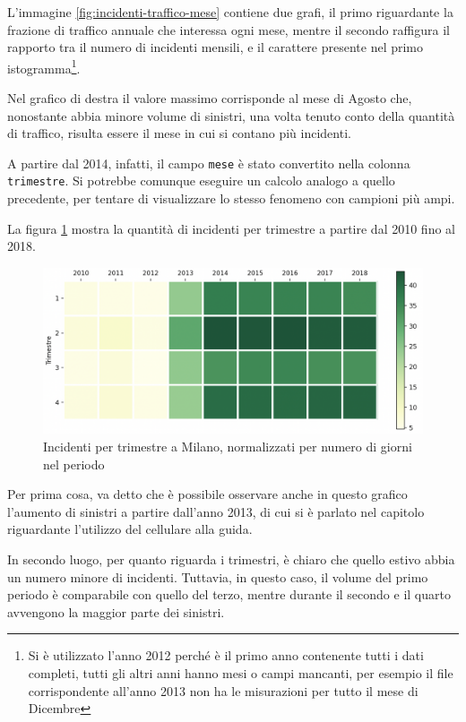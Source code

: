 \documentclass[a4paper]{report}
\newcommand{\columnstyle}[1]{\texttt{#1}}
\newcommand{\skipline}{\vspace{0.2in}}
\begin{document}
L'immagine \ref{fig:incidenti-traffico-mese} contiene due grafi, 
il primo riguardante la frazione di traffico annuale che interessa ogni mese, 
mentre il secondo raffigura il rapporto tra il numero di incidenti mensili, 
e il carattere presente nel primo
istogramma\footnote{Si è utilizzato l'anno 2012 perché è il primo anno contenente 
tutti i dati completi, tutti gli altri anni hanno mesi o campi mancanti, 
per esempio il file corrispondente all'anno 
2013 non ha le misurazioni per tutto il mese di Dicembre}. 

Nel grafico di destra il valore massimo corrisponde al mese di Agosto 
che, nonostante abbia minore volume di sinistri, 
una volta tenuto conto della quantità di traffico, risulta essere 
il mese in cui si contano più incidenti. 

\skipline
A partire dal 2014, infatti, il campo \columnstyle{mese} è stato convertito nella 
colonna \columnstyle{trimestre}. 
Si potrebbe comunque eseguire un calcolo analogo a quello precedente, 
per tentare di visualizzare lo stesso fenomeno con campioni più ampi. 

La figura \ref{fig:milano-trimestri} mostra la quantità di incidenti per 
trimestre a partire dal 2010 fino al 2018. 

\begin{figure}
    \includegraphics[width=\linewidth]{../src/incidenti/incidenti_senza_coords/mese_incidenti/trimestri.png}
    \caption{Incidenti per trimestre a Milano, normalizzati per numero di giorni nel periodo}
    \label{fig:milano-trimestri}
\end{figure}

Per prima cosa, va detto che è possibile osservare anche in questo grafico 
l'aumento di sinistri a partire dall'anno 2013, di cui si è parlato nel capitolo 
riguardante l'utilizzo del cellulare alla guida. 

In secondo luogo, per quanto riguarda i trimestri, è chiaro che quello estivo abbia 
un numero minore di incidenti. 
Tuttavia, in questo caso, il volume del primo periodo è comparabile 
con quello del terzo, 
mentre durante il secondo e il quarto avvengono la maggior parte dei sinistri. 
\end{document}
